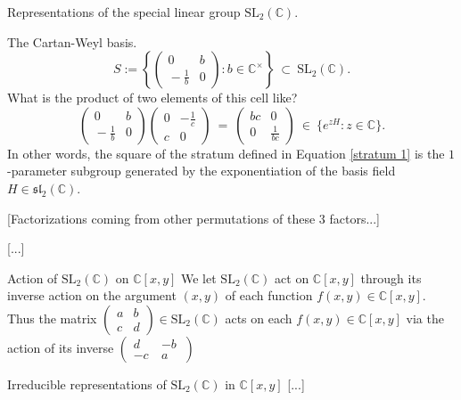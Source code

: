 \documentclass[letterpaper,11pt, reqno]{amsart}
\newtheorem{monodromy theorem}{Monodromy Theorem}[subsection]
\newtheorem{wild conjecture}[theorem]{Wild Conjecture}
\newtheorem{research objectives}{Research objectives}[subsection]
\newtheorem{research question}[theorem]{Research questions}
\newtheorem{aside question}[theorem]{Aside question}
\newtheorem{audio example}[theorem]{\loudspeaker[3] Example}
\newtheorem{blank remark}[theorem]{}
\newtheorem{terminology and comment}[theorem]{Terminology and comment}
\newtheorem{purity hypothesis}[theorem]{Purity hypothesis}
\newtheorem{corollary of the purity hypothesis}[theorem]{Corollary of the purity hypothesis}
\newcommand{\CC} {{\mathbb C}}
\numberwithin{equation}{theorem}
\begin{document}
\begin{section}{Representations of the special linear group $\text{SL}_{2}(\CC)$.}
\begin{subsection}{The Cartan-Weyl basis.}
	\begin{equation}\label{stratum 1}
	S:=\left\{\left(\begin{smallmatrix} 0 & b \\ \!\!-\tfrac{1}{b} & 0\end{smallmatrix}\right):b\in\CC^\times\right\}
	\ \subset\ 
	\text{SL}_{2}(\CC).
	\end{equation}
What is the product of two elements of this cell like?
	$$
	\left(\begin{matrix} 0 & b \\ \!\!-\tfrac{1}{b} & 0\end{matrix}\right)
	\left(\begin{matrix} 0 & -\tfrac{1}{c} \\ c & 0\!\!\end{matrix}\right)
	\ =\ \left(\begin{matrix} bc & 0 \\ 0 & \tfrac{1}{bc}\end{matrix}\right)
	\ \in\ \{e^{zH}:z\in\CC\}.
	$$
In other words, the square of the stratum defined in Equation \eqref{stratum 1} is the $1$-parameter subgroup generated by the exponentiation of the basis field $H\in\mathfrak{sl}_{2}(\CC)$.



{\color{red} [Factorizations coming from other permutations of these $3$ factors...]}

{\color{red} [...]}
\end{subsection}

\begin{subsection}{Action of $\text{SL}_{2}(\CC)$ on $\CC[x,y]$}
We let $\text{SL}_{2}(\CC)$ act on $\CC[x,y]$ through its inverse action on the argument $(x,y)$ of each function $f(x,y)\in\CC[x,y]$. Thus the matrix $\left(\begin{smallmatrix}a & b\\ c & d\end{smallmatrix}\right)\in\text{SL}_{2}(\CC)$ acts on each $f(x,y)\in\CC[x,y]$ via the action of its inverse $\left(\begin{smallmatrix}d & -b\ \\ -c\  & a\end{smallmatrix}\right)$
\end{subsection}

\begin{subsection}{Irreducible representations of $\text{SL}_2(\CC)$ in $\CC[x,y]$}
[...]
\end{subsection}


\end{section}
\end{document}

